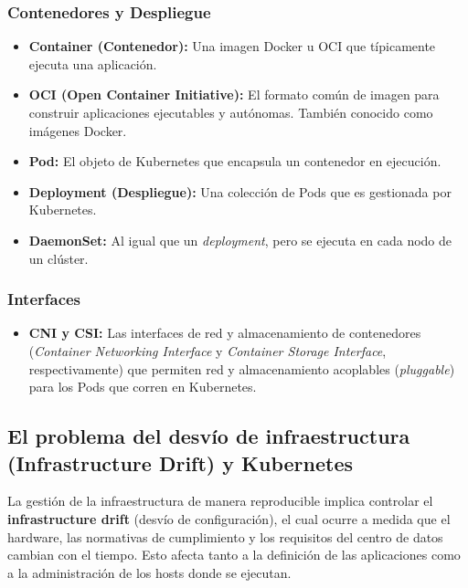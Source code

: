 \subsubsection{Contenedores y Despliegue}
\begin{itemize}
    \item \textbf{Container (Contenedor):} Una imagen Docker u OCI que típicamente ejecuta una aplicación.
    \item \textbf{OCI (Open Container Initiative):} El formato común de imagen para construir aplicaciones ejecutables y autónomas. También conocido como imágenes Docker.
    \item \textbf{Pod:} El objeto de Kubernetes que encapsula un contenedor en ejecución.
    \item \textbf{Deployment (Despliegue):} Una colección de Pods que es gestionada por Kubernetes.
    \item \textbf{DaemonSet:} Al igual que un \textit{deployment}, pero se ejecuta en cada nodo de un clúster.
\end{itemize}

\subsubsection{Interfaces}
\begin{itemize}
    \item \textbf{CNI y CSI:} Las interfaces de red y almacenamiento de contenedores (\textit{Container Networking Interface} y \textit{Container Storage Interface}, respectivamente) que permiten red y almacenamiento acoplables (\textit{pluggable}) para los Pods que corren en Kubernetes.
\end{itemize}

\subsection{El problema del desvío de infraestructura (Infrastructure Drift) y Kubernetes}

La gestión de la infraestructura de manera reproducible implica controlar el \textbf{infrastructure drift}
 (desvío de configuración), el cual ocurre a medida que el hardware, las normativas de cumplimiento 
 y los requisitos del centro de datos cambian con el tiempo. Esto afecta tanto a la definición de las 
 aplicaciones como a la administración de los hosts donde se ejecutan. 

